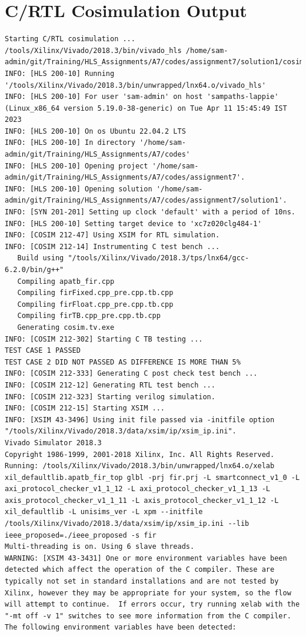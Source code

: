 \documentclass{article}
\begin{document}
\section{C/RTL Cosimulation Output}
\begin{lstlisting}
Starting C/RTL cosimulation ...
/tools/Xilinx/Vivado/2018.3/bin/vivado_hls /home/sam-admin/git/Training/HLS_Assignments/A7/codes/assignment7/solution1/cosim.tcl
INFO: [HLS 200-10] Running '/tools/Xilinx/Vivado/2018.3/bin/unwrapped/lnx64.o/vivado_hls'
INFO: [HLS 200-10] For user 'sam-admin' on host 'sampaths-lappie' (Linux_x86_64 version 5.19.0-38-generic) on Tue Apr 11 15:45:49 IST 2023
INFO: [HLS 200-10] On os Ubuntu 22.04.2 LTS
INFO: [HLS 200-10] In directory '/home/sam-admin/git/Training/HLS_Assignments/A7/codes'
INFO: [HLS 200-10] Opening project '/home/sam-admin/git/Training/HLS_Assignments/A7/codes/assignment7'.
INFO: [HLS 200-10] Opening solution '/home/sam-admin/git/Training/HLS_Assignments/A7/codes/assignment7/solution1'.
INFO: [SYN 201-201] Setting up clock 'default' with a period of 10ns.
INFO: [HLS 200-10] Setting target device to 'xc7z020clg484-1'
INFO: [COSIM 212-47] Using XSIM for RTL simulation.
INFO: [COSIM 212-14] Instrumenting C test bench ...
   Build using "/tools/Xilinx/Vivado/2018.3/tps/lnx64/gcc-6.2.0/bin/g++"
   Compiling apatb_fir.cpp
   Compiling firFixed.cpp_pre.cpp.tb.cpp
   Compiling firFloat.cpp_pre.cpp.tb.cpp
   Compiling firTB.cpp_pre.cpp.tb.cpp
   Generating cosim.tv.exe
INFO: [COSIM 212-302] Starting C TB testing ... 
TEST CASE 1 PASSED 
TEST CASE 2 DID NOT PASSED AS DIFFERENCE IS MORE THAN 5% 
INFO: [COSIM 212-333] Generating C post check test bench ...
INFO: [COSIM 212-12] Generating RTL test bench ...
INFO: [COSIM 212-323] Starting verilog simulation. 
INFO: [COSIM 212-15] Starting XSIM ...
INFO: [XSIM 43-3496] Using init file passed via -initfile option "/tools/Xilinx/Vivado/2018.3/data/xsim/ip/xsim_ip.ini".
Vivado Simulator 2018.3
Copyright 1986-1999, 2001-2018 Xilinx, Inc. All Rights Reserved.
Running: /tools/Xilinx/Vivado/2018.3/bin/unwrapped/lnx64.o/xelab xil_defaultlib.apatb_fir_top glbl -prj fir.prj -L smartconnect_v1_0 -L axi_protocol_checker_v1_1_12 -L axi_protocol_checker_v1_1_13 -L axis_protocol_checker_v1_1_11 -L axis_protocol_checker_v1_1_12 -L xil_defaultlib -L unisims_ver -L xpm --initfile /tools/Xilinx/Vivado/2018.3/data/xsim/ip/xsim_ip.ini --lib ieee_proposed=./ieee_proposed -s fir 
Multi-threading is on. Using 6 slave threads.
WARNING: [XSIM 43-3431] One or more environment variables have been detected which affect the operation of the C compiler. These are typically not set in standard installations and are not tested by Xilinx, however they may be appropriate for your system, so the flow will attempt to continue.  If errors occur, try running xelab with the "-mt off -v 1" switches to see more information from the C compiler. The following environment variables have been detected:

\end{lstlisting}
\end{document}
